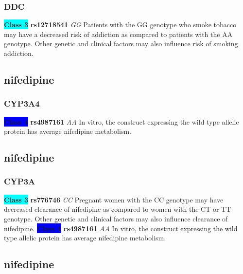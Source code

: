 \documentclass{book}
\begin{document}
\subsubsection{ DDC }

\begin{center}
\textbf{\colorbox{cyan} {Class 3}} \textbf{ rs12718541 } \textit{ GG }
Patients with the GG genotype who smoke tobacco may have a decreased risk of addiction as compared to patients with the AA genotype. Other genetic and clinical factors may also influence risk of smoking addiction.


\end{center}\subsection{ nifedipine }


\subsubsection{ CYP3A4 }

\begin{center}

\textbf{\colorbox{blue} {Class 4}} \textbf{ rs4987161 } \textit{ AA }
In vitro, the construct expressing the wild type allelic protein has average nifedipine metabolism.

\end{center}\subsection{ nifedipine }


\subsubsection{ CYP3A }

\begin{center}
\textbf{\colorbox{cyan} {Class 3}} \textbf{ rs776746 } \textit{ CC }
Pregnant women with the CC genotype may have decreased clearance of nifedipine as compared to women with the CT or TT genotype. Other genetic and clinical factors may also influence clearance of nifedipine.
\textbf{\colorbox{blue} {Class 4}} \textbf{ rs4987161 } \textit{ AA }
In vitro, the construct expressing the wild type allelic protein has average nifedipine metabolism.

\end{center}\subsection{ nifedipine }
\end{document}
